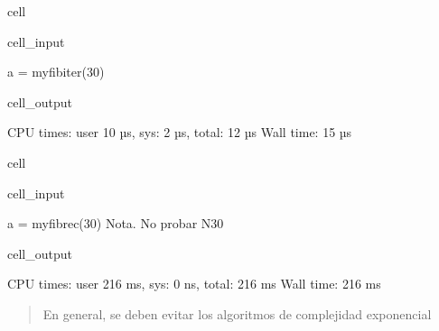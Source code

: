\documentclass[letterpaper,10pt,english]{jupyterBook}
\begin{document}
\begin{sphinxuseclass}{cell}\begin{sphinxVerbatimInput}

\begin{sphinxuseclass}{cell_input}
\begin{sphinxVerbatim}[commandchars=\\\{\}]
 a = my\PYGZus{}fib\PYGZus{}iter(30)
\end{sphinxVerbatim}

\end{sphinxuseclass}\end{sphinxVerbatimInput}
\begin{sphinxVerbatimOutput}

\begin{sphinxuseclass}{cell_output}
\begin{sphinxVerbatim}[commandchars=\\\{\}]
CPU times: user 10 µs, sys: 2 µs, total: 12 µs
Wall time: 15 µs
\end{sphinxVerbatim}

\end{sphinxuseclass}\end{sphinxVerbatimOutput}

\end{sphinxuseclass}
\begin{sphinxuseclass}{cell}\begin{sphinxVerbatimInput}

\begin{sphinxuseclass}{cell_input}
\begin{sphinxVerbatim}[commandchars=\\\{\}]
 a = my\PYGZus{}fib\PYGZus{}rec(30) \PYGZsh{}Nota. No probar N\PYGZgt{}30
\end{sphinxVerbatim}

\end{sphinxuseclass}\end{sphinxVerbatimInput}
\begin{sphinxVerbatimOutput}

\begin{sphinxuseclass}{cell_output}
\begin{sphinxVerbatim}[commandchars=\\\{\}]
CPU times: user 216 ms, sys: 0 ns, total: 216 ms
Wall time: 216 ms
\end{sphinxVerbatim}

\end{sphinxuseclass}\end{sphinxVerbatimOutput}

\end{sphinxuseclass}\begin{quote}

\sphinxAtStartPar
{} En general, se deben evitar los algoritmos de complejidad exponencial
\end{quote}
\end{document}
